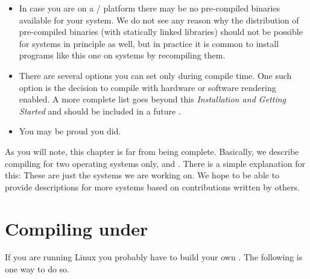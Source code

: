 \begin{itemize}
\item In case you are on a / platform there may be no
pre-compiled binaries available for your system. We do not
see any reason why the distribution of pre-compiled binaries (with statically linked
libraries) should not be possible for  systems in principle as well, but in
practice it is common to install programs like this one on  systems by
recompiling them.

\item There are several options you can set only during
compile time. One such option is the decision to compile with
hardware or software  rendering enabled. A more
complete list goes beyond this \textit{Installation and Getting
Started} and should be included in a future
\textit{}.

\item You may be proud you did.
\end{itemize}

As you will note, this chapter is far from being complete. Basically, we describe
compiling for two operating systems only,  and . There
is a simple explanation for this: These are just the systems we are working on. We hope
to be able to provide descriptions for more systems based on contributions written by
others.

\section{Compiling under }

If you are running Linux you probably have to build your own
. The following is one way to do so.

